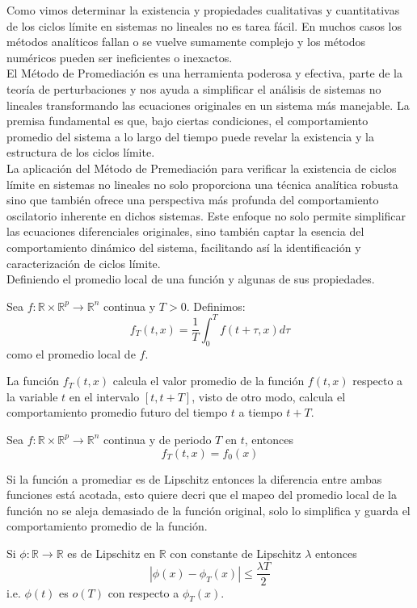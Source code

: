 Como vimos determinar la existencia y propiedades cualitativas y cuantitativas
de los ciclos límite en sistemas no lineales no es tarea fácil. En muchos
casos los métodos analíticos fallan o se vuelve sumamente complejo y los
métodos numéricos pueden ser ineficientes o inexactos. \\

El Método de Promediación es una herramienta poderosa y efectiva,
parte de la teoría de perturbaciones y nos ayuda a simplificar el análisis
de sistemas no lineales  transformando las ecuaciones originales en un sistema
más manejable. La premisa fundamental es que, bajo ciertas condiciones, el
comportamiento promedio del sistema a lo largo del tiempo puede revelar
la existencia y la estructura de los ciclos límite.\\

La aplicación del Método de Premediación para verificar la existencia de
ciclos límite en sistemas no lineales no solo proporciona una técnica
analítica robusta sino que también ofrece una perspectiva más profunda
del comportamiento oscilatorio inherente en dichos sistemas. Este enfoque
no solo permite simplificar las ecuaciones diferenciales originales, sino
también captar la esencia del comportamiento dinámico del sistema,
facilitando así la identificación y caracterización de ciclos límite.\\

Definiendo el promedio local de una función y algunas de sus propiedades.

\begin{definition}
	Sea $f:\mathbb{R}\times\mathbb{R}^p\to\mathbb{R}^n$ continua y $T>0$.
	Definimos:
	\[
		f_T(t,x)=\frac{1}{T}\int_{0}^{T}f(t+\tau,x)d\tau
	\]
	como el promedio local de $f$.
\end{definition}

La función $f_T(t,x)$ calcula el valor promedio de la función $f(t,x)$ 
respecto a la variable $t$ en el intervalo $[t,t+T]$, visto de otro 
modo, calcula el comportamiento promedio futuro del tiempo $t$ a tiempo $t+T$.

\begin{proposition}
	Sea $f:\mathbb{R}\times\mathbb{R}^p\to\mathbb{R}^n$ continua y de periodo $T$ en $t$, entonces
	\[
		f_T(t,x)=f_0(x)
	\]
\end{proposition}

Si la función a promediar es de Lipschitz entonces la diferencia entre ambas
funciones está acotada, esto quiere decri que el mapeo del promedio local de 
la función no se aleja demasiado de la función original, solo lo simplifica 
y guarda el comportamiento promedio de la función.
\begin{proposition}
	Si $\phi:\mathbb{R}\to\mathbb{R}$ es de Lipschitz en $\mathbb{R}$ con constante de Lipschitz $\lambda$ entonces
	\[
		|\phi(x)-\phi_T(x)|\leq\frac{\lambda T}{2}
	\]
	i.e. $\phi(t)$ es $o(T)$ con respecto a $\phi_T(x)$.
\end{proposition}

